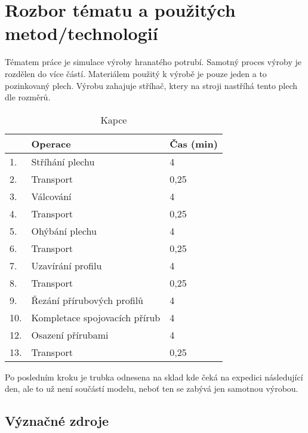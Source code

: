 \documentclass[11pt, a4paper]{article}
\begin{document}
\section{Rozbor tématu a použitých metod/technologií}
Tématem práce je simulace výroby hranatého potrubí. Samotný proces výroby je rozdělen do více částí. Materiálem použitý k výrobě je pouze jeden a to pozinkovaný plech. Výrobu zahajuje stříhač, ktery na stroji nastříhá tento plech dle rozměrů.
\begin{table}[H]
    \centering
    \begin{tabular}{|l|l|l|}
     \hline  & \textbf{Operace} &  \textbf{Čas (min)}\\ \hline
    1. &                Stříhání plechu   &  4\\ 
    2. &\hspace{0.1cm}  Transport   &  0,25\\ \hline
    3. &                Válcování    &  4\\ 
    4. &\hspace{0.1cm}  Transport   &  0,25\\ \hline
    5. &                Ohýbání plechu    &  4\\ 
    6. &\hspace{0.1cm}  Transport   &  0,25\\ \hline
    7. &                Uzavírání profilu    &  4\\ 
    8. &\hspace{0.1cm}  Transport   &  0,25\\ \hline
    9. &                Řezání přírubových profilů    &  4\\ \hline
    10. &               Kompletace spojovacích přírub    &  4\\ \hline
    12. &                Osazení přírubami    &  4\\ 
    13. &\hspace{0.1cm}  Transport   &  0,25\\ \hline
    
    \end{tabular}
    \caption{Kapce}
    \label{rgrg}
\end{table}

Po posledním kroku je trubka odnesena na sklad kde čeká na expedici následující den, ale to už není součástí modelu, neboť ten se zabývá jen samotnou výrobou.

\subsection{Význačné zdroje}
\end{document}
